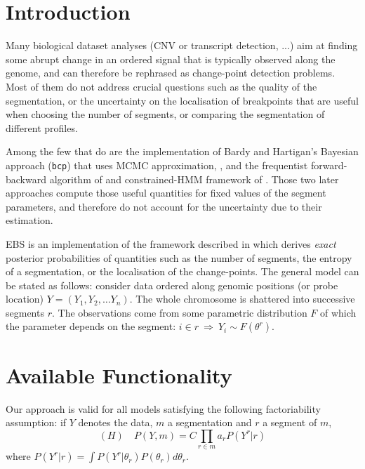\documentclass{bioinfo}
\begin{document}
\begin{methods}
\section{Introduction}

Many biological dataset analyses (CNV or transcript
  detection, ...) aim at finding some abrupt change in an ordered signal that
  is typically observed along the genome, and 
can therefore be rephrased as change-point detection
  problems. Most of them do not address
crucial questions such as the quality of the segmentation, or the
uncertainty on the localisation of breakpoints that are useful when
choosing the number of segments, or comparing the segmentation of
different profiles.

Among the few that do are the implementation of Bardy and Hartigan's
Bayesian approach (\texttt{bcp}) that uses MCMC approximation,
\citep{barry_hartigan, bcp_package}, and the frequentist
forward-backward algorithm of \cite{guedon_2008} and constrained-HMM
framework of \cite{Luong_HMM_2012}. Those two later approaches compute
those useful quantities for fixed values of the segment
parameters, and therefore do not account for the uncertainty due
  to their estimation.

EBS is an implementation of the framework described in
\cite{rigaill_exact_2011} which derives \textit{exact} posterior
probabilities of quantities such as the number of segments, the
entropy of a segmentation, or the localisation of the change-points.
The general model can be stated as
  follows: consider data ordered along genomic positions (or probe
  location) $Y = (Y_1, Y_2, \dots Y_n)$. The whole chromosome is
  shattered into successive segments $r$. The observations come from
  some parametric distribution $F$ of which the parameter depends on the
  segment: $i \in r \: \Rightarrow \: Y_i
  \sim F(\theta^r)$.


\section{Available Functionality}
Our approach is valid for all models satisfying the following factoriability
assumption: if $Y$ denotes the data, $m$ a segmentation and $r$ a
segment of $m$,
\begin{equation}
 (H)\quad P(Y,m) = C \prod_{r\in m} a_r P(Y^r|r) \label{factoriability}
\end{equation}
where $P(Y^r|r) =\int P(Y^r|\theta_r)P(\theta_r)d\theta_r $.


\end{methods}
\end{document}
